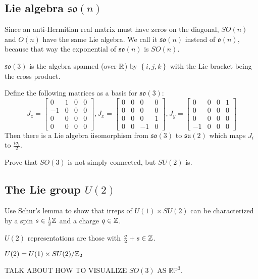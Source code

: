 \documentclass[class=article, crop=false]{standalone}
\begin{document}
\subsection{Lie algebra $\mathfrak{so}(n)$}
\begin{note}
    Since an anti-Hermitian real matrix must have zeros on the diagonal, $SO(n)$ and $O(n)$ have the same Lie algebra. We call it $\mathfrak{so}(n)$ instead of $\mathfrak{o}(n)$, because that way the exponential of $\mathfrak{so}(n)$ is $SO(n)$.
\end{note}
$\mathfrak{so}(3)$ is the algebra spanned (over $\mathbb{R}$) by $ \left\{ i,j,k \right\}$ with the Lie bracket being the cross product.
\par
Define the following matrices as a basis for $\mathfrak{so}(3)$:
\[ J_z = \begin{bmatrix}
    0 & 1 & 0 & 0 \\
    -1 & 0 & 0 & 0 \\
    0 & 0 & 0 & 0 \\
    0 & 0 & 0 & 0
\end{bmatrix}, J_x = \begin{bmatrix}
    0 & 0 & 0 & 0 \\
    0 & 0 & 0 & 0 \\
    0 & 0 & 0 & 1 \\
    0 & 0 & -1 & 0
\end{bmatrix}, J_y = \begin{bmatrix}
    0 & 0 & 0 & 1 \\
    0 & 0 & 0 & 0 \\
    0 & 0 & 0 & 0 \\
    -1 & 0 & 0 & 0
\end{bmatrix} \]
Then there is a Lie algebra iisomorphism from $\mathfrak{so}(3)$ to $\mathfrak{su}(2)$ which maps $J_i$ to $\frac{i\sigma_i}{2}$.
\par
Prove that $SO(3)$ is not simply connected, but $SU(2)$ is.
\subsection{The Lie group $U(2)$}
\begin{prob}
    Use Schur's lemma to show that irreps of $U(1) \times SU(2)$ can be characterized by a spin $s \in \frac{1}{2}\mathbb{Z}$ and a charge $q \in \mathbb{Z}$.
\end{prob}
\begin{thm}
    $U(2)$ representations are those with $\frac{q}{2}+s \in \mathbb{Z}$.
\end{thm}
\begin{cor}
    $U(2)=U(1) \times SU(2)/\mathbb{Z}_2$
\end{cor}
TALK ABOUT HOW TO VISUALIZE $SO(3)$ AS $\mathbb{RP}^3$.
\end{document}
